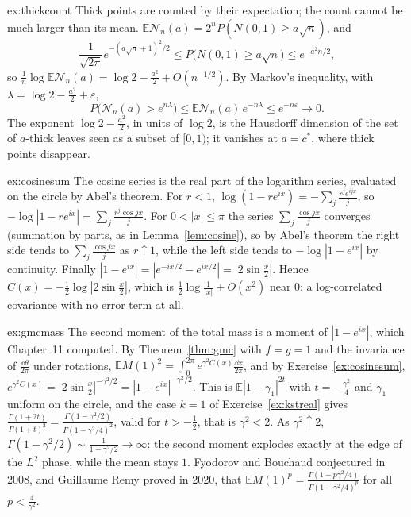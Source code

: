 \begin{solution}{ex:thickcount}
\idea Thick points are counted by their expectation; the count cannot be much larger than its mean.
\writeup $\mathbb E\mathcal N_n(a)=2^nP(N(0,1)\ge a\sqrt n)$, and
\[
\frac1{\sqrt{2\pi}}e^{-(a\sqrt n+1)^2/2}\le P\bigl(N(0,1)\ge a\sqrt n\bigr)\le e^{-a^2n/2},
\]
so $\frac1n\log\mathbb E\mathcal N_n(a)=\log2-\frac{a^2}2+O(n^{-1/2})$. By Markov's inequality, with $\lambda=\log2-\frac{a^2}2+\varepsilon$,
\[
P\bigl(\mathcal N_n(a)>e^{n\lambda}\bigr)\le\mathbb E\mathcal N_n(a)\,e^{-n\lambda}\le e^{-n\varepsilon}\to0 .
\] The exponent $\log2-\frac{a^2}2$, in units of $\log 2$, is the Hausdorff dimension of the set of $a$-thick leaves seen as a subset
of $[0,1)$; it vanishes at $a=c^*$, where thick points disappear.
\end{solution}

\begin{solution}{ex:cosinesum}
\idea The cosine series is the real part of the logarithm series, evaluated on the circle by Abel's theorem.
\writeup For $r<1$, $\log(1-re^{ix})=-\sum_j\frac{r^je^{ijx}}j$, so $-\log|1-re^{ix}|=\sum_j\frac{r^j\cos jx}j$. For $0<|x|\le\pi$ the series $\sum_j\frac{\cos jx}j$ converges (summation by parts, as in Lemma~\ref{lem:cosine}), so by Abel's theorem
the right side tends to $\sum_j\frac{\cos jx}j$ as $r\uparrow1$, while the left side tends to $-\log|1-e^{ix}|$ by continuity. Finally $|1-e^{ix}|=|e^{-ix/2}-e^{ix/2}|=|2\sin\frac x2|$. Hence $C(x)=-\frac12\log|2\sin\frac x2|$, which is $\frac12\log\frac1{|x|}+O(x^2)$
near $0$: a log-correlated covariance with no error term at all.
\end{solution}

\begin{solution}{ex:gmcmass}
\idea The second moment of the total mass is a moment of $|1-e^{ix}|$, which Chapter~11 computed.
\writeup By Theorem~\ref{thm:gmc} with $f=g=1$ and the invariance of $\frac{\dd\theta}{2\pi}$ under rotations, $\mathbb EM(1)^2=\int_0^{2\pi}e^{\gamma^2C(x)}\frac{\dd x}{2\pi}$, and by Exercise~\ref{ex:cosinesum}, $e^{\gamma^2C(x)}=|2\sin\frac x2|^{-\gamma^2/2}=|1-e^{ix}|^{-\gamma^2/2}$. This is
$\mathbb E|1-\gamma_1|^{2t}$ with $t=-\frac{\gamma^2}4$ and $\gamma_1$ uniform on the circle, and the case $k=1$ of Exercise~\ref{ex:kstreal} gives $\frac{\Gamma(1+2t)}{\Gamma(1+t)^2}=\frac{\Gamma(1-\gamma^2/2)}{\Gamma(1-\gamma^2/4)^2}$, valid for $t>-\frac12$, that is $\gamma^2<2$. As $\gamma^2\uparrow2$,
$\Gamma(1-\gamma^2/2)\sim\frac1{1-\gamma^2/2}\to\infty$: the second moment explodes exactly at the edge of the $L^2$ phase, while the mean stays $1$. Fyodorov and Bouchaud conjectured in 2008, and Guillaume Remy proved in 2020, that
$\mathbb EM(1)^p=\frac{\Gamma(1-p\gamma^2/4)}{\Gamma(1-\gamma^2/4)^p}$ for all $p<\frac4{\gamma^2}$.
\end{solution}

